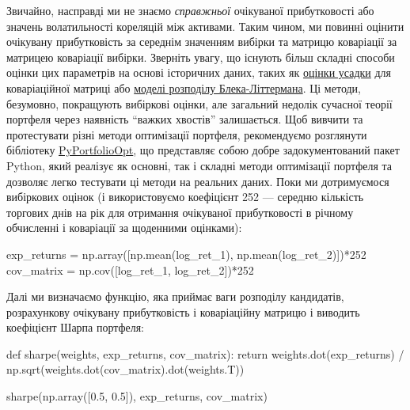 \documentclass[
  letterpaper,
]{report}
\newenvironment{Shaded}{\begin{snugshade}}{\end{snugshade}}
\newcommand{\ControlFlowTok}[1]{\textcolor[rgb]{0.00,0.23,0.31}{#1}}
\newcommand{\DecValTok}[1]{\textcolor[rgb]{0.68,0.00,0.00}{#1}}
\newcommand{\FloatTok}[1]{\textcolor[rgb]{0.68,0.00,0.00}{#1}}
\newcommand{\KeywordTok}[1]{\textcolor[rgb]{0.00,0.23,0.31}{#1}}
\newcommand{\NormalTok}[1]{\textcolor[rgb]{0.00,0.23,0.31}{#1}}
\newcommand{\OperatorTok}[1]{\textcolor[rgb]{0.37,0.37,0.37}{#1}}
\begin{document}
Звичайно, насправді ми не знаємо \emph{справжньої} очікуваної
прибутковості або значень волатильності кореляцій між активами. Таким
чином, ми повинні оцінити очікувану прибутковість за середнім значенням
вибірки та матрицю коваріації за матрицею коваріації вибірки. Зверніть
увагу, що існують більш складні способи оцінки цих параметрів на основі
історичних даних, таких як \href{http://www.ledoit.net/honey.pdf}{оцінки
усадки} для коваріаційної матриці або
\href{https://sci-hub.mksa.top/10.3905/jfi.1991.408013}{моделі розподілу
Блека-Літтермана}. Ці методи, безумовно, покращують вибіркові оцінки,
але загальний недолік сучасної теорії портфеля через наявність ``важких
хвостів'' залишається. Щоб вивчити та протестувати різні методи
оптимізації портфеля, рекомендуємо розглянути бібліотеку
\href{https://pyportfolioopt.readthedocs.io/en/latest/index.html}{PyPortfolioOpt},
що представляє собою добре задокументований пакет Python, який реалізує
як основні, так і складні методи оптимізації портфеля та дозволяє легко
тестувати ці методи на реальних даних. Поки ми дотримуємося вибіркових
оцінок (і використовуємо коефіцієнт 252 --- середню кількість торгових
днів на рік для отримання очікуваної прибутковості в річному обчисленні
і коваріації за щоденними оцінками):

\begin{Shaded}
\begin{Highlighting}[]
\NormalTok{exp\_returns }\OperatorTok{=}\NormalTok{ np.array([np.mean(log\_ret\_1), np.mean(log\_ret\_2)])}\OperatorTok{*}\DecValTok{252}
\NormalTok{cov\_matrix }\OperatorTok{=}\NormalTok{ np.cov([log\_ret\_1, log\_ret\_2])}\OperatorTok{*}\DecValTok{252}
\end{Highlighting}
\end{Shaded}

Далі ми визначаємо функцію, яка приймає ваги розподілу кандидатів,
розрахункову очікувану прибутковість і коваріаційну матрицю і виводить
коефіцієнт Шарпа портфеля:

\begin{Shaded}
\begin{Highlighting}[]
\KeywordTok{def}\NormalTok{ sharpe(weights, exp\_returns, cov\_matrix):}
    \ControlFlowTok{return}\NormalTok{ weights.dot(exp\_returns) }\OperatorTok{/}\NormalTok{ np.sqrt(weights.dot(cov\_matrix).dot(weights.T))}

\NormalTok{sharpe(np.array([}\FloatTok{0.5}\NormalTok{, }\FloatTok{0.5}\NormalTok{]), exp\_returns, cov\_matrix)}
\end{Highlighting}
\end{Shaded}
\end{document}
